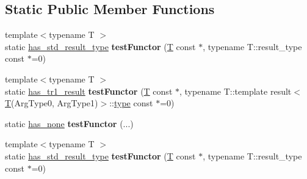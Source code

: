 \subsection*{Static Public Member Functions}
\begin{DoxyCompactItemize}
\item 
\mbox{\label{struct_eigen_1_1internal_1_1result__of_3_01_func_07_arg_type0_00_01_arg_type1_08_4_ac01536f71856aa83a6c5f16ec960c38a}} 
{\footnotesize template$<$typename T $>$ }\\static \hyperlink{struct_eigen_1_1internal_1_1has__std__result__type}{has\+\_\+std\+\_\+result\+\_\+type} {\bfseries test\+Functor} (\hyperlink{group___sparse_core___module}{T} const $\ast$, typename T\+::result\+\_\+type const $\ast$=0)
\item 
\mbox{\label{struct_eigen_1_1internal_1_1result__of_3_01_func_07_arg_type0_00_01_arg_type1_08_4_aa1cb85adf69c0fcd326bdc7080ab0d81}} 
{\footnotesize template$<$typename T $>$ }\\static \hyperlink{struct_eigen_1_1internal_1_1has__tr1__result}{has\+\_\+tr1\+\_\+result} {\bfseries test\+Functor} (\hyperlink{group___sparse_core___module}{T} const $\ast$, typename T\+::template result$<$ \hyperlink{group___sparse_core___module}{T}(Arg\+Type0, Arg\+Type1)$>$\+::\hyperlink{group___sparse_core___module}{type} const $\ast$=0)
\item 
\mbox{\label{struct_eigen_1_1internal_1_1result__of_3_01_func_07_arg_type0_00_01_arg_type1_08_4_a583c311eaa5282bc065a1e379d2b8031}} 
static \hyperlink{struct_eigen_1_1internal_1_1has__none}{has\+\_\+none} {\bfseries test\+Functor} (...)
\item 
\mbox{\label{struct_eigen_1_1internal_1_1result__of_3_01_func_07_arg_type0_00_01_arg_type1_08_4_ac01536f71856aa83a6c5f16ec960c38a}} 
{\footnotesize template$<$typename T $>$ }\\static \hyperlink{struct_eigen_1_1internal_1_1has__std__result__type}{has\+\_\+std\+\_\+result\+\_\+type} {\bfseries test\+Functor} (\hyperlink{group___sparse_core___module}{T} const $\ast$, typename T\+::result\+\_\+type const $\ast$=0)

\end{DoxyCompactItemize}

